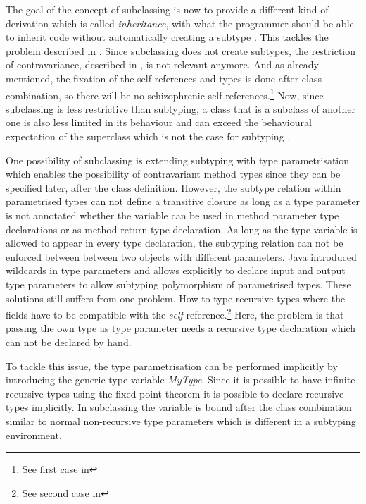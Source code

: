 The goal of the concept of subclassing is now to provide a different kind
of derivation which is called \emph{inheritance}, with what the programmer
should be able to inherit code without automatically creating a subtype
\cite{simons_theory_2002-2}. This tackles the problem described in
. Since subclassing does not create subtypes, the
restriction of contravariance, described in ,
is not relevant anymore. And as already mentioned, the fixation of the
self references and types is done after class combination, so there
will be no schizophrenic self-references.\footnote{See first case in
} Now, since subclassing is less restrictive
than subtyping, a class that is a subclass of another one
is also less limited in its behaviour and
can exceed the behavioural expectation of the superclass which is not
the case for subtyping \cite{simons_theory_2002-2}.

One possibility of subclassing is extending subtyping with type
parametrisation which enables the possibility of contravariant
method types since they can be specified later, after the class
definition. However, the subtype relation within parametrised types
can not define a transitive closure as long as a type parameter is not
annotated whether the variable can be used in method parameter type
declarations or as method return type declaration. As long as the type
variable is allowed to appear in every type declaration, the subtyping
relation can not be enforced between between two objects with different
parameters. Java introduced wildcards in type parameters and \cs
allows explicitly to declare input and output type parameters to allow
subtyping polymorphism of parametrised types. These solutions still
suffers from one problem. How to type recursive types where the fields
have to be compatible with the \emph{self}-reference.\footnote{See second
case in } Here, the problem is that passing
the own type as type parameter needs a recursive type declaration which
can not be declared by hand.

To tackle this issue, the type parametrisation can be performed
implicitly by introducing the generic type variable \emph{MyType}. Since
it is possible to have infinite recursive types using the fixed point
theorem \cite{pierce_types_2002} it is possible to declare recursive
types implicitly. In subclassing the \mytype variable is bound after
the class combination similar to normal non-recursive type parameters
which is different in a subtyping environment.

